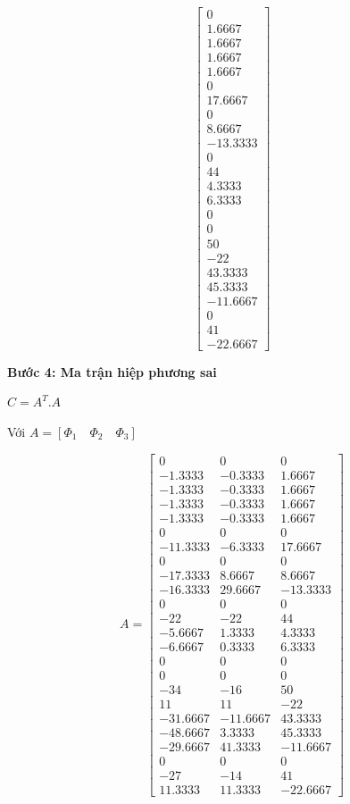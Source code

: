 \[\begin{bmatrix}
0 \\
1.6667 \\
1.6667 \\
1.6667 \\
1.6667 \\
0 \\
17.6667 \\
0 \\
8.6667 \\
-13.3333 \\
0 \\
44 \\
4.3333 \\
6.3333 \\
0 \\
0 \\
50 \\
-22 \\
43.3333 \\
45.3333 \\
-11.6667 \\
0 \\
41 \\
-22.6667
\end{bmatrix}
\]

\textbf{Bước 4: Ma trận hiệp phương sai}

$C = A^T.A$

Với $A = [\Phi_1 \quad \Phi_2 \quad \Phi_3]$

\[
A = \begin{bmatrix}
0 & 0 & 0 \\
-1.3333 & -0.3333 & 1.6667 \\
-1.3333 & -0.3333 & 1.6667 \\
-1.3333 & -0.3333 & 1.6667 \\
-1.3333 & -0.3333 & 1.6667 \\
0 & 0 & 0 \\
-11.3333 & -6.3333 & 17.6667 \\
0 & 0 & 0 \\
-17.3333 & 8.6667 & 8.6667 \\
-16.3333 & 29.6667 & -13.3333 \\
0 & 0 & 0 \\
-22 & -22 & 44 \\
-5.6667 & 1.3333 & 4.3333 \\
-6.6667 & 0.3333 & 6.3333 \\
0 & 0 & 0 \\
0 & 0 & 0 \\
-34 & -16 & 50 \\
11 & 11 & -22 \\
-31.6667 & -11.6667 & 43.3333 \\
-48.6667 & 3.3333 & 45.3333 \\
-29.6667 & 41.3333 & -11.6667 \\
0 & 0 & 0 \\
-27 & -14 & 41 \\
11.3333 & 11.3333 & -22.6667
\end{bmatrix}
\]

